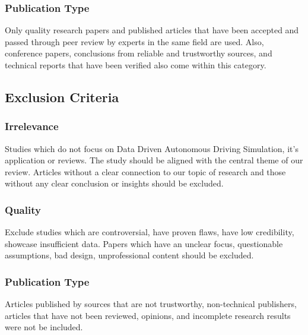 \documentclass[lettersize,journal]{IEEEtran}
\begin{document}
\subsubsection{Publication Type}
Only quality research papers and published articles that have been accepted and passed through peer review by experts in the same field are used. Also, conference papers, conclusions from reliable and trustworthy sources, and technical reports that have been verified also come within this category.

\subsection{Exclusion Criteria}
\subsubsection{Irrelevance}
Studies which do not focus on Data Driven Autonomous Driving Simulation, it's application or reviews. The study should be aligned with the central theme of our review. Articles without a clear connection to our topic of research and those without any clear conclusion or insights should be excluded.

\subsubsection{Quality}
Exclude studies which are controversial, have proven flaws, have low credibility, showcase insufficient data. Papers which have an unclear focus, questionable assumptions, bad design, unprofessional content should be excluded.

\subsubsection{Publication Type}
Articles published by sources that are not trustworthy, non-technical publishers, articles that have not been reviewed, opinions, and incomplete research results were not be included.
\end{document}
